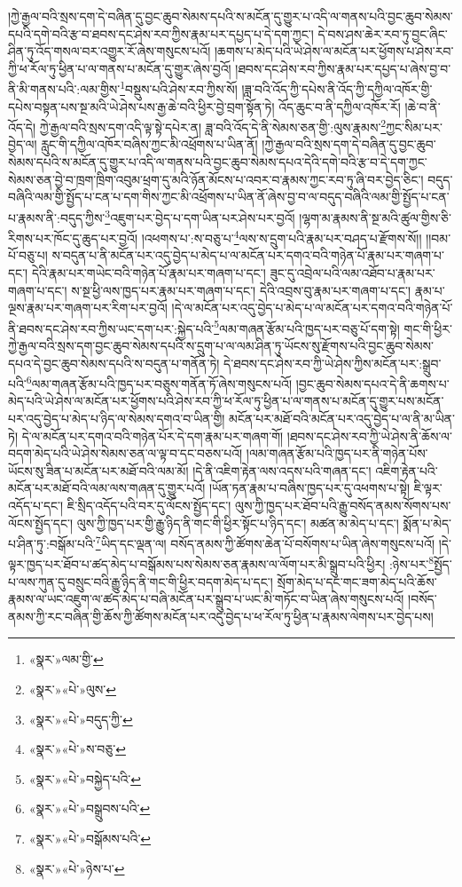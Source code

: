 །ཀྱེ་རྒྱལ་བའི་སྲས་དག་དེ་བཞིན་དུ་བྱང་ཆུབ་སེམས་དཔའི་ས་མངོན་དུ་གྱུར་པ་འདི་ལ་གནས་པའི་བྱང་ཆུབ་སེམས་དཔའི་དགེ་བའི་རྩ་བ་ཐབས་དང་ཤེས་རབ་ཀྱིས་རྣམ་པར་དཔྱད་པ་དེ་དག་ཀྱང་། དེ་བས་ཤས་ཆེར་རབ་ཏུ་བྱང་ཞིང་ཤིན་ཏུ་འོད་གསལ་བར་འགྱུར་རོ་ཞེས་གསུངས་པའོ། །ཆགས་པ་མེད་པའི་ཡེ་ཤེས་ལ་མངོན་པར་ཕྱོགས་པ་ཤེས་རབ་ཀྱི་ཕ་རོལ་ཏུ་ཕྱིན་པ་ལ་གནས་པ་མངོན་དུ་གྱུར་ཞེས་བྱའོ། །ཐབས་དང་ཤེས་རབ་ཀྱིས་རྣམ་པར་དཔྱད་པ་ཞེས་བྱ་བ་ནི་མི་གནས་པའི་:ལམ་གྱིས་\footnote{«སྣར་»ལམ་གྱི་}བསྡུས་པའི་ཤེས་རབ་ཀྱིས་སོ། །ཟླ་བའི་འོད་ཀྱི་དཔེས་ནི་འོད་ཀྱི་དཀྱིལ་འཁོར་གྱི་དཔེས་བསྟན་པས་སྔ་མའི་ཡེ་ཤེས་པས་རྒྱ་ཆེ་བའི་ཕྱིར་བྱེ་བྲག་སྟོན་ཏེ། འོད་ཆུང་བ་ནི་དཀྱིལ་འཁོར་རོ། །ཆེ་བ་ནི་འོད་དེ། ཀྱེ་རྒྱལ་བའི་སྲས་དག་འདི་ལྟ་སྟེ་དཔེར་ན། ཟླ་བའི་འོད་དེ་ནི་སེམས་ཅན་གྱི་:ལུས་རྣམས་\footnote{«སྣར་»«པེ་»ལུས་}ཀྱང་སིམ་པར་བྱེད་ལ། རླུང་གི་དཀྱིལ་འཁོར་བཞིས་ཀྱང་མི་འཕྲོགས་པ་ཡིན་ནོ། །ཀྱེ་རྒྱལ་བའི་སྲས་དག་དེ་བཞིན་དུ་བྱང་ཆུབ་སེམས་དཔའི་ས་མངོན་དུ་གྱུར་པ་འདི་ལ་གནས་པའི་བྱང་ཆུབ་སེམས་དཔའ་དེའི་དགེ་བའི་རྩ་བ་དེ་དག་ཀྱང་སེམས་ཅན་བྱེ་བ་ཁྲག་ཁྲིག་འབུམ་ཕྲག་དུ་མའི་ཉོན་མོངས་པ་འབར་བ་རྣམས་ཀྱང་རབ་ཏུ་ཞི་བར་བྱེད་ཅིང་། བདུད་བཞིའི་ལམ་གྱི་སྤྱོད་པ་ངན་པ་དག་གིས་ཀྱང་མི་འཕྲོགས་པ་ཡིན་ནོ་ཞེས་བྱ་བ་ལ་བདུད་བཞིའི་ལམ་གྱི་སྤྱོད་པ་ངན་པ་རྣམས་ནི་:བདུད་ཀྱིས་\footnote{«སྣར་»«པེ་»བདུད་ཀྱི་}འཇུག་པར་བྱེད་པ་དག་ཡིན་པར་ཤེས་པར་བྱའོ། །ལྷག་མ་རྣམས་ནི་སྔ་མའི་ཚུལ་གྱིས་ཅི་རིགས་པར་ཁོང་དུ་ཆུད་པར་བྱའོ། །འཕགས་པ་:ས་བཅུ་པ་\footnote{«སྣར་»«པེ་»ས་བཅུ་}ལས་ས་དྲུག་པའི་རྣམ་པར་བཤད་པ་རྫོགས་སོ།། །།བམ་པོ་བཅུ་པ། ས་བདུན་པ་ནི་མངོན་པར་འདུ་བྱེད་པ་མེད་པ་ལ་མངོན་པར་དགའ་བའི་གཉེན་པོ་རྣམ་པར་གཞག་པ་དང་། དེའི་རྣམ་པར་གཡེང་བའི་གཉེན་པོ་རྣམ་པར་གཞག་པ་དང་། ཟུང་དུ་འབྲེལ་པའི་ལམ་འཐོབ་པ་རྣམ་པར་གཞག་པ་དང་། ས་སྔ་ཕྱི་ལས་ཁྱད་པར་རྣམ་པར་གཞག་པ་དང་། དེའི་འབྲས་བུ་རྣམ་པར་གཞག་པ་དང་། རྣམ་པ་ལྔས་རྣམ་པར་གཞག་པར་རིག་པར་བྱའོ། །དེ་ལ་མངོན་པར་འདུ་བྱེད་པ་མེད་པ་ལ་མངོན་པར་དགའ་བའི་གཉེན་པོ་ནི་ཐབས་དང་ཤེས་རབ་ཀྱིས་ཡང་དག་པར་:སྐྱེད་པའི་\footnote{«སྣར་»«པེ་»བསྐྱེད་པའི་}ལམ་གཞན་རྩོམ་པའི་ཁྱད་པར་བཅུ་པོ་དག་སྟེ། གང་གི་ཕྱིར་ཀྱེ་རྒྱལ་བའི་སྲས་དག་བྱང་ཆུབ་སེམས་དཔའི་ས་དྲུག་པ་ལ་ལམ་ཤིན་ཏུ་ཡོངས་སུ་རྫོགས་པའི་བྱང་ཆུབ་སེམས་དཔའ་དེ་བྱང་ཆུབ་སེམས་དཔའི་ས་བདུན་པ་གནོན་ཏེ། དེ་ཐབས་དང་ཤེས་རབ་ཀྱི་ཡེ་ཤེས་ཀྱིས་མངོན་པར་:སྒྲུབ་པའི་\footnote{«སྣར་»«པེ་»བསྒྲུབས་པའི་}ལམ་གཞན་རྩོམ་པའི་ཁྱད་པར་བཅུས་གནོན་ཏོ་ཞེས་གསུངས་པའོ། །བྱང་ཆུབ་སེམས་དཔའ་དེ་ནི་ཆགས་པ་མེད་པའི་ཡེ་ཤེས་ལ་མངོན་པར་ཕྱོགས་པའི་ཤེས་རབ་ཀྱི་ཕ་རོལ་ཏུ་ཕྱིན་པ་ལ་གནས་པ་མངོན་དུ་གྱུར་པས་མངོན་པར་འདུ་བྱེད་པ་མེད་པ་ཉིད་ལ་སེམས་དགའ་བ་ཡིན་གྱི། མངོན་པར་མཐོ་བའི་མངོན་པར་འདུ་བྱེད་པ་ལ་ནི་མ་ཡིན་ཏེ། དེ་ལ་མངོན་པར་དགའ་བའི་གཉེན་པོར་དེ་དག་རྣམ་པར་གཞག་གོ། །ཐབས་དང་ཤེས་རབ་ཀྱི་ཡེ་ཤེས་ནི་ཆོས་ལ་བདག་མེད་པའི་ཡེ་ཤེས་སེམས་ཅན་ལ་ལྟ་བ་དང་བཅས་པའོ། །ལམ་གཞན་རྩོམ་པའི་ཁྱད་པར་ནི་གཉེན་པོས་ཡོངས་སུ་ཟིན་པ་མངོན་པར་མཐོ་བའི་ལམ་མོ། །དེ་ནི་འཇིག་རྟེན་ལས་འདས་པའི་གཞན་དང་། འཇིག་རྟེན་པའི་མངོན་པར་མཐོ་བའི་ལམ་ལས་གཞན་དུ་གྱུར་པའོ། །ཡོན་ཏན་རྣམ་པ་བཞིས་ཁྱད་པར་དུ་འཕགས་པ་སྟེ། ཇི་ལྟར་འདོད་པ་དང་། ཇི་སྲིད་འདོད་པའི་བར་དུ་ལོངས་སྤྱོད་དང་། ལུས་ཀྱི་ཁྱད་པར་ཐོབ་པའི་རྒྱུ་བསོད་ནམས་སོགས་པས་ལོངས་སྤྱོད་དང་། ལུས་ཀྱི་ཁྱད་པར་གྱི་རྒྱུ་ཉིད་ནི་གང་གི་ཕྱིར་སྟོང་པ་ཉིད་དང་། མཚན་མ་མེད་པ་དང་། སྨོན་པ་མེད་པ་ཤིན་ཏུ་:བསྒོམ་པའི་\footnote{«སྣར་»«པེ་»བསྒོམས་པའི་}ཡིད་དང་ལྡན་ལ། བསོད་ནམས་ཀྱི་ཚོགས་ཆེན་པོ་བསོགས་པ་ཡིན་ཞེས་གསུངས་པའོ། །དེ་ལྟར་ཁྱད་པར་ཐོབ་པ་ཚད་མེད་པ་བསྒོམས་པས་སེམས་ཅན་རྣམས་ལ་ལོག་པར་མི་སྒྲུབ་པའི་ཕྱིར། :ཉེས་པར་\footnote{«སྣར་»«པེ་»ཉེས་པ་}སྤྱོད་པ་ལས་ཀུན་དུ་བསྲུང་བའི་རྒྱུ་ཉིད་ནི་གང་གི་ཕྱིར་བདག་མེད་པ་དང་། སྲོག་མེད་པ་དང་གང་ཟག་མེད་པའི་ཆོས་རྣམས་ལ་ཡང་འཇུག་ལ་ཚད་མེད་པ་བཞི་མངོན་པར་སྒྲུབ་པ་ཡང་མི་གཏོང་བ་ཡིན་ཞེས་གསུངས་པའོ། །བསོད་ནམས་ཀྱི་རང་བཞིན་གྱི་ཆོས་ཀྱི་ཚོགས་མངོན་པར་འདུ་བྱེད་པ་ཕ་རོལ་ཏུ་ཕྱིན་པ་རྣམས་ལེགས་པར་བྱེད་པས། 